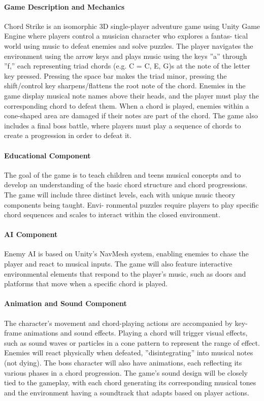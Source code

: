 \documentclass[11pt]{article}
\begin{document}
\maketitle

\paragraph*{Game Description and Mechanics}
Chord Strike is an isomorphic 3D single-player adventure
game using Unity Game Engine where players control a musician character who explores a fantas-
tical world using music to defeat enemies and solve puzzles. The player navigates the environment
using the arrow keys and plays music using the keys ”a” through ”f,” each representing triad chords
(e.g. C = C, E, G)s at the note of the letter key pressed. Pressing the space bar makes the triad
minor, pressing the shift/control key sharpens/flattens the root note of the chord. Enemies in the
game display musical note names above their heads, and the player must play the corresponding
chord to defeat them. When a chord is played, enemies within a cone-shaped area are damaged if
their notes are part of the chord. The game also includes a final boss battle, where players must
play a sequence of chords to create a progression in order to defeat it.

\paragraph*{Educational Component}
The goal of the game is to teach children and teens musical concepts
and to develop an understanding of the basic chord structure and chord progressions. The game
will include three distinct levels, each with unique music theory components being taught. Envi-
ronmental puzzles require players to play specific chord sequences and scales to interact within the
closed environment.

\paragraph*{AI Component}
Enemy AI is based on Unity’s NavMesh system, enabling enemies to chase the
player and react to musical inputs. The game will also feature interactive environmental elements
that respond to the player’s music, such as doors and platforms that move when a specific chord is
played.

\paragraph*{Animation and Sound Component}
The character’s movement and chord-playing actions are
accompanied by key-frame animations and sound effects. Playing a chord will trigger visual effects,
such as sound waves or particles in a cone pattern to represent the range of effect. Enemies will
react physically when defeated, ”disintegrating” into musical notes (not dying). The boss character
will also have animations, each reflecting its various phases in a chord progression. The game’s
sound design will be closely tied to the gameplay, with each chord generating its corresponding
musical tones and the environment having a soundtrack that adapts based on player actions.
\end{document}
